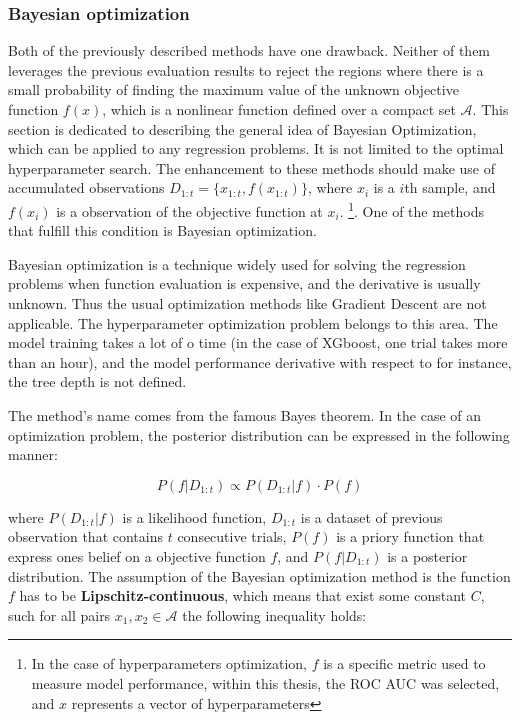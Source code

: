\subsubsection{Bayesian optimization}
\label{sec:BayesOpt}
Both of the previously described methods have one drawback. Neither of them leverages the previous evaluation results to reject the regions where there is a small probability of finding the maximum value of the unknown objective function $f(x)$, which is a nonlinear function defined over a compact set $\mathcal{A}$. This section is dedicated to describing the general idea of Bayesian Optimization, which can be applied to any regression problems. It is not limited to the optimal hyperparameter search. The enhancement to these methods should make use of accumulated observations $D_{1:t} = \{ x_{1:t}, f(x_{1:t}) \}$, where $x_i$ is a $i$th sample, and $f(x_i)$ is a observation of the objective function at $x_i$.   \footnote{In the case of hyperparameters optimization, $f$ is a specific metric used to measure model performance, within this thesis, the ROC AUC was selected,  and $x$ represents a vector of hyperparameters }. One of the methods that fulfill this condition is Bayesian optimization.  
 
Bayesian optimization is a technique widely used for solving the regression problems when function evaluation is expensive, and the derivative is usually unknown. Thus the usual optimization methods like Gradient Descent are not applicable. The hyperparameter optimization problem belongs to this area. The model training takes a lot of o time (in the case of XGboost, one trial takes more than an hour), and the model performance derivative with respect to for instance, the tree depth is not defined. 

The method's name comes from the famous Bayes theorem. In the case of an optimization problem, the posterior distribution can be expressed in the following manner: 

\begin{equation}
\label{eq:BO_posteriori}
    P(f|D_{1:t}) \propto P(D_{1:t} | f) \cdot  P(f)
\end{equation}

where $ P(D_{1:t} | f)$ is a likelihood function, $D_{1:t}$ is a dataset of previous observation that contains $t$  consecutive trials, $P(f)$ is a priory function that express ones belief on a objective function $f$, and  $P(f|D_{1:t})$ is a posterior distribution. The assumption of the Bayesian optimization method is the function $f$ has to be \textbf{Lipschitz-continuous}, which means that exist some constant $C$, such for all pairs $x_1, x_2  \in \mathcal{A}$ the following inequality holds:

